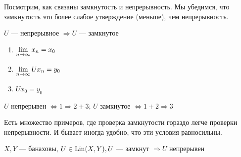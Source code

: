 \documentclass[document]{subfiles}
\begin{document}
Посмотрим, как связаны замкнутость и непрерывность. Мы убедимся, что замкнутость это более слабое утверждение (меньше), чем непрерывность.

\begin{remark}
    $U$ --- непрерывное $\Rightarrow U$ --- замкнутое
    \begin{enumerate}
        \item $\lim\limits_{n \to \infty} x_n = x_0 $
        \item $\lim\limits_{n \to \infty} Ux_n = y_0$
        \item $Ux_0 = y_0$
    \end{enumerate}
    $U \text{ непрерывен } \Leftrightarrow 1 \Rightarrow 2 + 3$; $U \text{ замкнутое } \Leftrightarrow 1 + 2 \Rightarrow 3$
\end{remark}

Есть множество примеров, где проверка замкнутости гораздо легче проверки непрерывности. И бывает иногда удобно, что эти условия равносильны.

\begin{theorem*}
    $X,Y$ --- банаховы, $U \in \operatorname{Lin}(X,Y), U$ --- замкнут $\Rightarrow U$ непрерывен
\end{theorem*}
\end{document}
